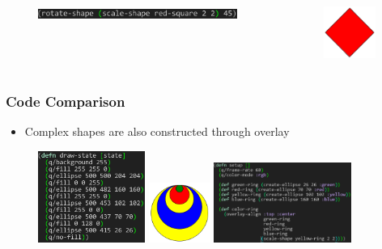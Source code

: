 \documentclass{beamer}
\begin{document}
\begin{frame}[fragile]
\begin{itemize}
		\begin{columns}[t]
		\begin{column}{.45\textwidth}
			\begin{figure}[h]
			\vspace{-0.5cm}
			\includegraphics[width=6.5cm]{PresentationImages/rotateAndScaleRedCode.png}
			\end{figure}
		\end{column}
		\begin{column}{.3\textwidth}
			\begin{figure}[h]
			\includegraphics[width=1.7cm]{PresentationImages/red-rectangle-scale-rotate.png}
			\end{figure}		
		\end{column}
		\end{columns}
	\end{itemize}
\end{frame}

\begin{frame}
\frametitle{Code Comparison}
	\begin{itemize}
		\item Complex shapes are also constructed through overlay
	\end{itemize}
	\begin{figure}
	\hspace{-0.7cm}
	\includegraphics[width=3.5cm]{PresentationImages/theirRingsCode.png}
	\hspace{0.1cm}
	\includegraphics[width=2cm]{PresentationImages/rings.png}
	\hspace{0.1cm}
	\includegraphics[width=4.5cm]{PresentationImages/ourRingsCode.png}
	\end{figure}
\end{frame}
\end{document}
